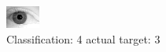 \begin{figure}[h!]
\begin{center}
\includegraphics[width=0.60\columnwidth]{figures/ID2191_class_4_target_3.png}
\end{center}
\caption{ Classification: 4 actual target: 3}
\label{fig:ID2191_class_4_target_3}
\end{figure}
